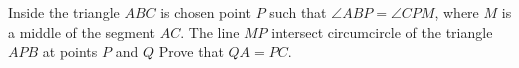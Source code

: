 \problem{}
Inside the triangle $ABC$ is chosen point $P$ such that $\angle ABP = \angle CPM$, where $M$ is a middle of the segment $AC$.
The line $MP$ intersect circumcircle of the triangle $APB$ at points $P$ and $Q$
Prove that $QA = PC$.

\solution

\endproblem
